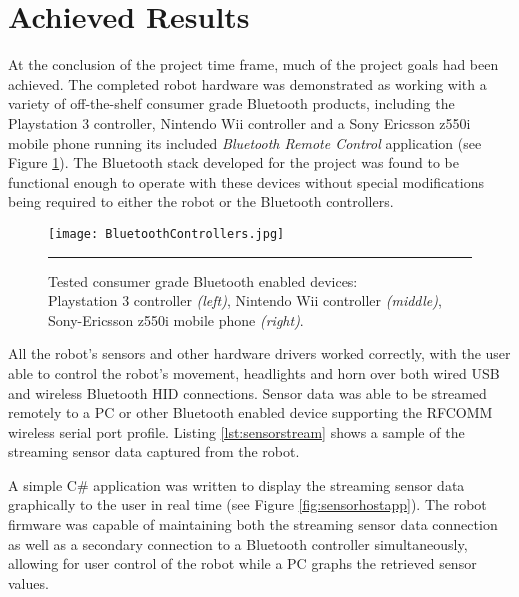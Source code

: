 \section{Achieved Results}

At the conclusion of the project time frame, much of the project goals had been achieved. The completed robot hardware was demonstrated as working with a variety of off-the-shelf consumer grade Bluetooth products, including the Playstation 3 controller, Nintendo Wii controller and a Sony Ericsson z550i mobile phone running its included \textit{Bluetooth Remote Control} application (see Figure \ref{fig:workingbtcontrollers}). The Bluetooth stack developed for the project was found to be functional enough to operate with these devices without special modifications being required to either the robot or the Bluetooth controllers.

\begin{figure}[tbph]
	\vspace{1em}
	\centering
		\texttt{[image: BluetoothControllers.jpg]}
	\rule{35em}{0.5pt}
	\caption[Tested working Bluetooth controllers]{Tested consumer grade Bluetooth enabled devices: \\ Playstation 3 controller \textit{(left)}, Nintendo Wii controller \textit{(middle)}, Sony-Ericsson z550i mobile phone \textit{(right)}.}
	\label{fig:workingbtcontrollers}
\end{figure}

All the robot's sensors and other hardware drivers worked correctly, with the user able to control the robot's movement, headlights and horn over both wired USB and wireless Bluetooth HID connections. Sensor data was able to be streamed remotely to a PC or other Bluetooth enabled device supporting the RFCOMM wireless serial port profile. Listing \ref{lst:sensorstream} shows a sample of the streaming sensor data captured from the robot.



A simple C\# application was written to display the streaming sensor data graphically to the user in real time (see Figure \ref{fig:sensorhostapp}). The robot firmware was capable of maintaining both the streaming sensor data connection as well as a secondary connection to a Bluetooth controller simultaneously, allowing for user control of the robot while a PC graphs the retrieved sensor values.

